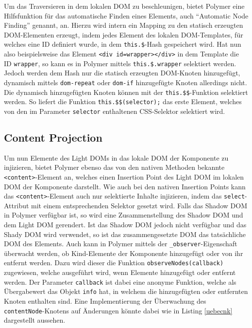Um das Traversieren in dem lokalen \ac{DOM} zu beschleunigen, bietet Polymer eine Hilfsfunktion für das automatische Finden eines Elements, auch ``Automatic Node Finding'' genannt, an. Hierzu wird intern ein Mapping zu den statisch erzeugten \ac{DOM}-Elementen erzeugt, indem jedes Element des lokalen \ac{DOM}-Templates, für welches eine ID definiert wurde, in dem \texttt{this.\$}-Hash gespeichert wird. Hat nun also beispielsweise das Element \texttt{\textless{}div\ id=\dq wrapper\dq\textgreater{}\textless{}/div\textgreater{}} in dem Template die ID \texttt{wrapper}, so kann es in Polymer mittels \texttt{this.\$.wrapper} selektiert werden. Jedoch werden dem Hash nur die statisch erzeugten \ac{DOM}-Knoten hinzugefügt, dynamisch mittels \texttt{dom-repeat} oder \texttt{dom-if} hinzugefügte Knoten allerdings nicht. Die dynamisch hinzugefügten Knoten können mit der \texttt{this.\$\$}-Funktion selektiert werden. So liefert die Funktion \texttt{this.\$\$(selector);} das erste Element, welches von den im Parameter \texttt{selector} enthaltenen \ac{CSS}-Selektor selektiert wird.


\subsection{Content Projection}\label{polymer-content-projection}

Um nun Elemente des Light \ac{DOM}s in das lokale \ac{DOM} der Komponente zu injizieren, bietet Polymer ebenso das von den nativen Methoden bekannte \texttt{\textless{}content\textgreater{}}-Element an, welches einen Insertion Point des Light \ac{DOM} im lokalen \ac{DOM} der Komponente darstellt. Wie auch bei den nativen Insertion Points kann das \texttt{\textless{}content\textgreater{}}-Element auch nur selektierte Inhalte injizieren, indem das \texttt{select}-Attribut mit einem entsprechenden Selektor gesetzt wird. Falls das Shadow \ac{DOM} in Polymer verfügbar ist, so wird eine Zusammenstellung des Shadow \ac{DOM} und dem Light \ac{DOM} gerendert. Ist das Shadow \ac{DOM} jedoch nicht verfügbar und das Shady \ac{DOM} wird verwendet, so ist das zusammengesetzte \ac{DOM} das tatsächliche \ac{DOM} des Elements. Auch kann in Polymer mittels der \texttt{\_observer}-Eigenschaft überwacht werden, ob Kind-Elemente der Komponente hinzugefügt oder von ihr entfernt werden. Dazu wird dieser die Funktion \texttt{observeNodes(callback)} zugewiesen, welche ausgeführt wird, wenn Elemente hinzugefügt oder entfernt werden. Der Parameter \texttt{callback} ist dabei eine anonyme Funktion, welche als Übergabewert das Objekt \texttt{info} hat, in welchem die hinzugefügten oder entfernten Knoten enthalten sind. Eine Implementierung der Überwachung des \texttt{contentNode}-Knotens auf Änderungen könnte dabei wie in Listing \ref{uebecnk} dargestellt aussehen.

